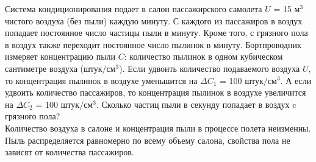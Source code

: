 Система кондиционирования подает в салон пассажирского самолета $U$ = 15 м$^3$ чистого воздуха (без пыли) каждую минуту. С каждого из пассажиров в воздух попадает постоянное число частицы пыли в минуту. Кроме того, с грязного пола в воздух также переходит постоянное число пылинок в минуту. Бортпроводник измеряет концентрацию пыли $C$: количество пылинок в одном кубическом сантиметре воздуха (штук$/$см$^3$). Если удвоить количество подаваемого воздуха $U$, то концентрация пылинок в воздухе уменьшится на $\Delta C_1$ = 100 штук$/$см$^3$. А если удвоить количество пассажиров, то концентрация пылинок в воздухе увеличится на $\Delta C_2$ = 100 штук$/$см$^3$. Сколько частиц пыли в секунду попадает в воздух c грязного пола? \\
Количество воздуха в салоне и концентрация пыли в процессе полета неизменны. Пыль распределяется равномерно по всему объему салона, свойства пола не зависят от количества пассажиров.